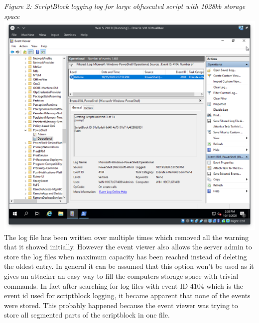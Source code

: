 \documentclass{article}%
\begin{document}
\textit{Figure 2: ScriptBlock logging log for large obfuscated script with 1028kb storage space}\\
\includegraphics[scale=0.44]{2}
The log file has been written over multiple times which removed all the warning that it showed initially. However the event viewer also allows the server admin to store the log files when maximum capacity has been reached instead of deleting the oldest entry. In general it can be assumed that this option won't be used as it gives an attacker an easy way to fill the computers storage space with trivial commands. In fact after searching for log files with event ID $4104$ which is the event id used for scriptblock logging, it became apparent that none of the events were stored. This probably happened because the event viewer was trying to store all segmented parts of the scriptblock in one file.
\end{document}
